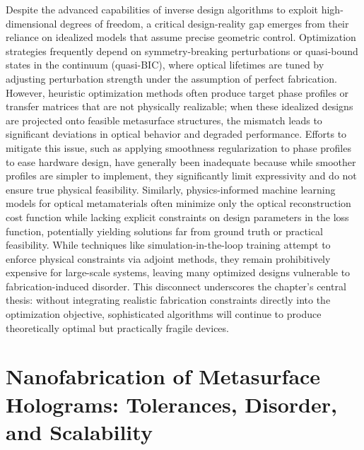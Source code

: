 Despite the advanced capabilities of inverse design algorithms to exploit high-dimensional degrees of freedom, a critical design-reality gap emerges from their reliance on idealized models that assume precise geometric control. Optimization strategies frequently depend on symmetry-breaking perturbations or quasi-bound states in the continuum (quasi-BIC), where optical lifetimes are tuned by adjusting perturbation strength under the assumption of perfect fabrication. However, heuristic optimization methods often produce target phase profiles or transfer matrices that are not physically realizable; when these idealized designs are projected onto feasible metasurface structures, the mismatch leads to significant deviations in optical behavior and degraded performance. Efforts to mitigate this issue, such as applying smoothness regularization to phase profiles to ease hardware design, have generally been inadequate because while smoother profiles are simpler to implement, they significantly limit expressivity and do not ensure true physical feasibility. Similarly, physics-informed machine learning models for optical metamaterials often minimize only the optical reconstruction cost function while lacking explicit constraints on design parameters in the loss function, potentially yielding solutions far from ground truth or practical feasibility. While techniques like simulation-in-the-loop training attempt to enforce physical constraints via adjoint methods, they remain prohibitively expensive for large-scale systems, leaving many optimized designs vulnerable to fabrication-induced disorder. This disconnect underscores the chapter's central thesis: without integrating realistic fabrication constraints directly into the optimization objective, sophisticated algorithms will continue to produce theoretically optimal but practically fragile devices. \citep{doi_10_1103_physrevapplied_21_044004_d1b93ffe} \citep{doi_10_48550_arxiv_2505_18377_a6fc9ec3} \citep{doi_10_1002_adpr_202300158_66d61883}

\section{Nanofabrication of Metasurface Holograms: Tolerances, Disorder, and Scalability}\label{nanofabrication-of-metasurface-holograms-tolerances-disorder-and-scalability}

